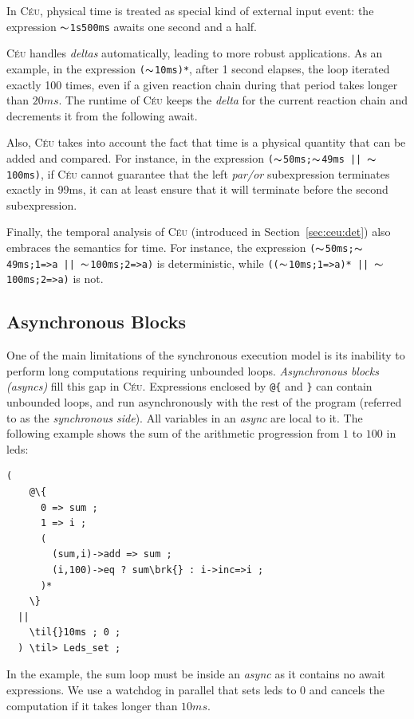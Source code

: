 \documentclass{sig-alternate-ipsn09}
\newcommand{\2}{\;\;}
\newcommand{\5}{\;\;\;\;\;}
\newcommand{\til}{$\thicksim$}
\newcommand{\brk}{\textbf{\small{$^\wedge$}}}
\newcommand{\CEU}{\textsc{C\'{e}u}}
\newcommand{\code}[1] {{\small{\texttt{#1}}}}
\begin{document}
In \CEU{}, physical time is treated as special kind of external input event: 
the expression \code{\til{}1s500ms} awaits one second and a half.

\CEU{} handles \emph{deltas} automatically, leading to more robust 
applications.
As an example, in the expression \code{(\til{}10ms)*}, after 1 second elapses, 
the loop iterated exactly 100 times, even if a given reaction chain during that 
period takes longer than $20ms$.
The runtime of \CEU{} keeps the \emph{delta} for the current reaction chain and 
decrements it from the following await.

Also, \CEU{} takes into account the fact that time is a physical quantity that 
can be added and compared.
For instance, in the expression \code{(\til{}50ms;\til{}49ms~||~\til{}100ms)}, 
if \CEU{} cannot guarantee that the left \emph{par/or} subexpression terminates 
exactly in 99ms, it can at least ensure that it will terminate before the 
second subexpression.

Finally, the temporal analysis of \CEU{} (introduced in 
Section~\ref{sec:ceu:det}) also embraces the semantics for time.
For instance, the expression 
\code{(\til{}50ms;\til{}49ms;1=>a~||~\til{}100ms;2=>a)}
is deterministic, while \code{((\til{}10ms;1=>a)*~||~\til{}100ms;2=>a)} is not.

\subsection{Asynchronous Blocks}
\label{sec:ceu:async}

One of the main limitations of the synchronous execution model is its inability 
to perform long computations requiring unbounded loops.
\emph{Asynchronous blocks (asyncs)} fill this gap in \CEU{}.
Expressions enclosed by \code{@\{} and \code{\}} can contain unbounded loops, 
and run asynchronously with the rest of the program (referred to as the 
\emph{synchronous side}).
All variables in an \emph{async} are local to it.
The following example shows the sum of the arithmetic progression from $1$ to 
$100$ in leds:

\begin{Verbatim}[commandchars=\\\{\}]
  (
    @\{
      0 => sum ;
      1 => i ;
      (
        (sum,i)->add => sum ;
        (i,100)->eq ? sum\brk{} : i->inc=>i ;
      )*
    \}
  ||
    \til{}10ms ; 0 ;
  ) \til> Leds_set ;
\end{Verbatim}

In the example, the sum loop must be inside an \emph{async} as it contains no 
await expressions.
We use a watchdog in parallel that sets leds to $0$ and cancels the computation 
if it takes longer than $10ms$.
\end{document}
